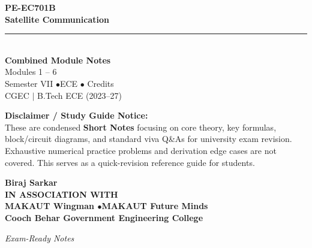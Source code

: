 \documentclass[12pt,a4paper]{article}
\begin{document}
\thispagestyle{empty}


\vspace*{1.0cm}
\begin{center}
  {\Huge\bfseries\color{myred} PE-EC701B}\\[10pt]
  {\LARGE\bfseries\color{mydark} Satellite Communication}\\[20pt]
  {\color{myred}\rule{0.7\linewidth}{1.5pt}}\\[18pt]
  {\Large\color{myteal}\textbf{Combined Module Notes}}\\[8pt]
  {\large\color{mydark} Modules 1 -- 6}\\[40pt]
  {\normalsize\color{mydark} Semester VII \quad$\bullet$\quad ECE \quad$\bullet$ Credits}\\[12pt]
  {\normalsize\color{mydark} CGEC \;$|$\; B.Tech ECE (2023--27)}
\end{center}
\vspace{1.0cm}
\begin{center}
  \begin{tcolorbox}[colback=mygray, colframe=mgframe, boxrule=0.5pt, arc=3pt, width=0.85\linewidth]
    \centering\small\color{mydark}
    \textbf{Disclaimer / Study Guide Notice:}\\
    These are condensed \textbf{Short Notes} focusing on core theory, key formulas, block/circuit diagrams, and standard viva Q\&As for university exam revision. Exhaustive numerical practice problems and derivation edge cases are not covered. This serves as a quick-revision reference guide for students.
  \end{tcolorbox}
\end{center}
\vfill
\vspace{0.6cm}
\begin{center}
  {\large\bfseries\color{mypurple} Biraj Sarkar}\\[16pt]
  {\footnotesize\color{watermark}\textbf{IN ASSOCIATION WITH}}\\[8pt]
  {\small\bfseries\color{mydark} MAKAUT Wingman \quad$\bullet$\quad MAKAUT Future Minds}\\[12pt]
  {\large\bfseries\color{myteal} Cooch Behar Government Engineering College}
\end{center}
\vfill
\begin{center}{\small\color{watermark}\textit{Exam-Ready Notes}}\end{center}
\clearpage
\end{document}
